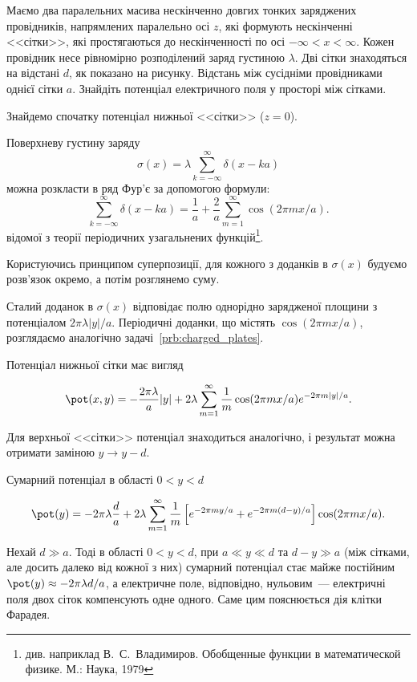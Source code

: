 \begin{problem}\label{prb:Faraday_cage}
Маємо два паралельних масива нескінченно довгих тонких заряджених провідників, напрямлених паралельно осі $z$, які формують нескінченні <<сітки>>, які простягаються до нескінченності по осі $-\infty < x < \infty$. Кожен провідник несе рівномірно розподілений заряд густиною $\lambda$. Дві сітки знаходяться на відстані $d$, як показано на рисунку. Відстань між сусідніми провідниками однієї сітки $a$. Знайдіть потенціал електричного поля у просторі між сітками.
\begin{solution}
	Знайдемо спочатку потенціал нижньої <<сітки>> ($z = 0$).

Поверхневу густину заряду
\[
    \sigma(x) = \lambda\sum\limits_{k = -\infty}^{\infty} \delta(x - ka)
\]
можна розкласти в ряд Фур'є за допомогою формули:
	\[
		\sum\limits_{k = -\infty}^{\infty} \delta(x - ka) =  \frac{1}{a} + \frac{2}{a}\sum\limits_{m=1}^{\infty}\cos(2\pi mx/a).
	\]
відомої з теорії періодичних узагальнених функцій\footnote{див. наприклад В.~С.~Владимиров. Обобщенные функции в математической физике. М.: Наука, 1979}.

Користуючись принципом суперпозиції, для кожного з доданків в $\sigma(x)$  будуємо розв’язок окремо, а потім розглянемо суму.

Сталий доданок в $\sigma(x)$  відповідає полю однорідно зарядженої площини з потенціалом $2\pi\lambda|y|/a$. Періодичні доданки, що містять $\cos(2\pi mx/a)$, розглядаємо аналогічно задачі~\ref{prb:charged_plates}.

Потенціал нижньої сітки має вигляд


	\[
		\pot(x,y) = -\frac{2\pi\lambda}{a}|y| + 2\lambda\sum\limits_{m = 1}^{\infty} \frac1m \cos(2\pi mx/a)e^{-2\pi m|y|/a}.
	\]

	Для верхньої  <<сітки>> потенціал знаходиться аналогічно, і результат можна отримати заміною $y \to y - d$.

    Сумарний потенціал в області $0 < y <d$


	\[
		\pot(y) = -2\pi\lambda\frac{d}{a} + 2\lambda\sum\limits_{m = 1}^{\infty} \frac1m \left[ e^{-2\pi my/a} +  e^{-2\pi m (d - y)/a} \right] \cos(2\pi mx/a).
	\]

Нехай $d \gg a$. Тоді в області $0<y<d$, при $a \ll y \ll d$ та $d - y \gg a$ (між сітками, але досить далеко від кожної з них) сумарний потенціал стає майже постійним $\pot(y) \approx  - 2\pi \lambda d/a$, а електричне поле, відповідно, нульовим~--- електричні поля двох сіток компенсують одне одного.  Саме цим пояснюється дія клітки Фарадея.

\end{solution}
\end{problem}

